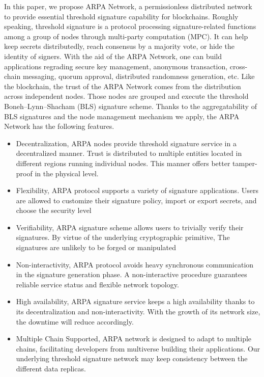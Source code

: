 \documentclass[11pt]{article}
\begin{document}
In this paper, we propose ARPA Network, a permissionless distributed network to provide essential threshold signature capability for blockchains. Roughly speaking, threshold signature is a protocol processing signature-related functions among a group of nodes through multi-party computation (MPC). It can help keep secrets distributedly, reach consensus by a majority vote, or hide the identity of signers. With the aid of the ARPA Network, one can build applications regrading secure key management, anonymous transaction, cross-chain messaging, quorum approval, distributed randomness generation, etc. Like the blockchain, the trust of the ARPA Network comes from the distribution across independent nodes. Those nodes are grouped and execute the threshold Boneh–Lynn–Shacham (BLS) signature scheme. Thanks to the aggregatability of BLS signatures and the node management mechanism we apply, the ARPA Network has the following features.
\begin{itemize}
    \item Decentralization, ARPA nodes provide threshold signature service in a decentralized manner. Trust is distributed to multiple entities located in different regions running individual nodes. This manner offers better tamper-proof in the physical level.
    \item Flexibility, ARPA protocol supports a variety of signature applications. Users are allowed to customize their signature policy, import or export secrets, and choose the security level
    \item Verifiability, ARPA signature scheme allows users to trivially verify their signatures. By virtue of the underlying cryptographic primitive, The signatures are unlikely to be forged or manipulated
    \item Non-interactivity, ARPA protocol avoids heavy synchronous communication in the signature generation phase. A non-interactive procedure guarantees reliable service status and flexible network topology.
    \item High availability, ARPA signature service keeps a high availability thanks to its decentralization and non-interactivity. With the growth of its network size, the downtime will reduce accordingly.
    \item Multiple Chain Supported, ARPA network is designed to adapt to multiple chains, facilitating developers from multiverse building their applications. Our underlying threshold signature network may keep consistency between the different data replicas.
\end{itemize}
\end{document}
